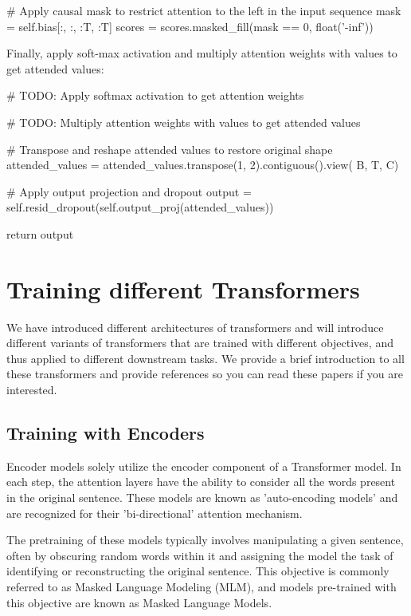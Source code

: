 \begin{exercise}
\begin{enumerate}
\begin{python}
        # Apply causal mask to restrict attention to the left in the input sequence
        mask = self.bias[:, :, :T, :T]
        scores = scores.masked_fill(mask == 0, float('-inf'))
\end{python}
Finally, apply soft-max activation and multiply attention weights with values to get attended values:
\begin{python}
        # TODO: Apply softmax activation to get attention weights

        # TODO: Multiply attention weights with values to get attended values

        # Transpose and reshape attended values to restore original shape
        attended_values = attended_values.transpose(1, 2).contiguous().view(
            B, T, C)

        # Apply output projection and dropout
        output = self.resid_dropout(self.output_proj(attended_values))

        return output
\end{python}
\end{enumerate}
\end{exercise}

\section{Training different Transformers}
We have introduced different architectures of transformers and will introduce different variants of transformers that are trained with different objectives, and thus applied to different downstream tasks. We provide a brief introduction to all these transformers and provide references so you can read these papers if you are interested.

\subsection{Training with Encoders}
Encoder models solely utilize the encoder component of a Transformer model. In each step, the attention layers have the ability to consider all the words present in the original sentence. These models are known as 'auto-encoding models' and are recognized for their 'bi-directional' attention mechanism.

The pretraining of these models typically involves manipulating a given sentence, often by obscuring random words within it and assigning the model the task of identifying or reconstructing the original sentence. This objective is commonly referred to as Masked Language Modeling (MLM), and models pre-trained with this objective are known as Masked Language Models.

